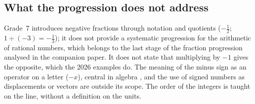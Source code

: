 \documentclass[11pt,a4paper]{article}
\theoremstyle{definition}
\begin{document}
\subsection{What the progression does not address}
Grade~7 introduces negative fractions through notation and quotients ($-\tfrac12$; $1\div(-3)=-\tfrac13$); it does not provide a systematic progression for the arithmetic of rational numbers, which belongs to the last stage of the fraction progression analysed in the companion paper. It does not state that multiplying by $-1$ gives the opposite, which the 2026 examples do. The meaning of the minus sign as an operator on a letter ($-x$), central in algebra \citep{Vlassis2004}, and the use of signed numbers as displacements or vectors are outside its scope. The order of the integers is taught on the line, without a definition on the units.
\end{document}
